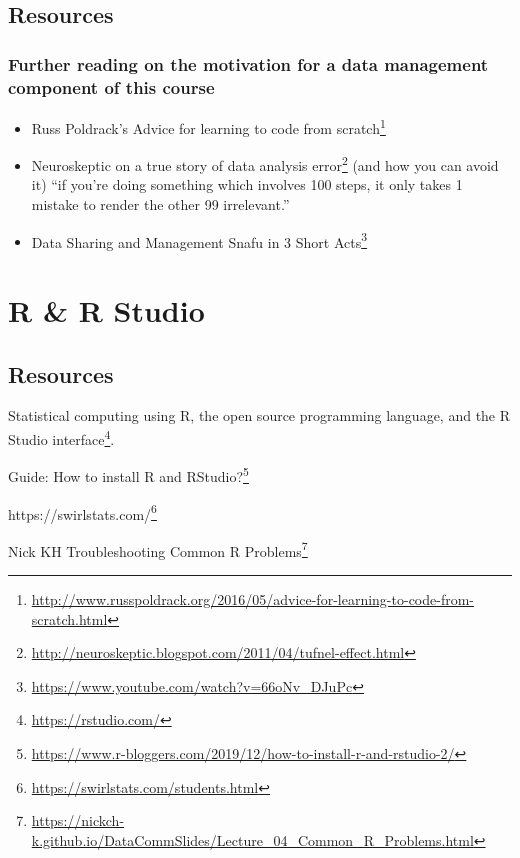 \documentclass[
  12pt,
  a5paper,
]{book}
\DeclareRobustCommand{\href}[2]{#2\footnote{\url{#1}}}
\providecommand{\tightlist}{%
  \setlength{\itemsep}{0pt}\setlength{\parskip}{0pt}}
\begin{document}
\hypertarget{resources}{%
\section{Resources}\label{resources}}

\hypertarget{further-reading-on-the-motivation-for-a-data-management-component-of-this-course}{%
\subsection{Further reading on the motivation for a data management component of this course}\label{further-reading-on-the-motivation-for-a-data-management-component-of-this-course}}

\begin{itemize}
\tightlist
\item
  Russ Poldrack's \href{http://www.russpoldrack.org/2016/05/advice-for-learning-to-code-from-scratch.html}{Advice for learning to code from scratch}
\item
  Neuroskeptic on a \href{http://neuroskeptic.blogspot.com/2011/04/tufnel-effect.html}{true story of data analysis error} (and how you can avoid it) ``if you're doing something which involves 100 steps, it only takes 1 mistake to render the other 99 irrelevant.''
\item
  \href{https://www.youtube.com/watch?v=66oNv_DJuPc}{Data Sharing and Management Snafu in 3 Short Acts}
\end{itemize}

\hypertarget{r-r-studio}{%
\chapter{R \& R Studio}\label{r-r-studio}}

\hypertarget{resources-1}{%
\section{Resources}\label{resources-1}}

Statistical computing using R, the open source programming language, and the \href{https://rstudio.com/}{R Studio interface}.

Guide: \href{https://www.r-bloggers.com/2019/12/how-to-install-r-and-rstudio-2/}{How to install R and RStudio?}

\href{https://swirlstats.com/students.html}{https://swirlstats.com/}

Nick KH Troubleshooting \href{https://nickch-k.github.io/DataCommSlides/Lecture_04_Common_R_Problems.html}{Common R Problems}
\end{document}
